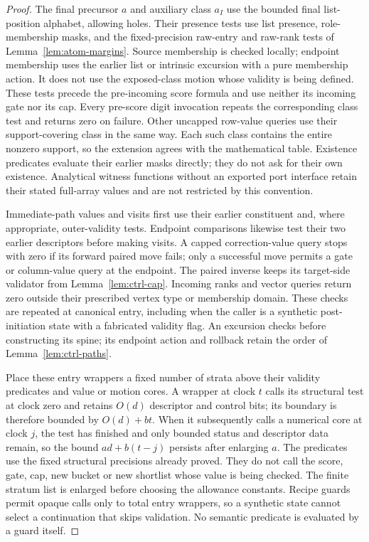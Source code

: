 \documentclass[11pt]{article}
\numberwithin{equation}{section}
\theoremstyle{definition}
\theoremstyle{remark}
\begin{document}
\begin{proof}
The final precursor ${a}$ and auxiliary class ${a}_I$ use the bounded final
list-position alphabet, allowing holes. Their presence tests use list
presence, role-membership masks, and the fixed-precision raw-entry and
raw-rank tests of Lemma~\ref{lem:atom-margins}. Source membership is
checked locally; endpoint membership uses the earlier list or intrinsic
excursion with a pure membership action. It does not use the exposed-class
motion whose validity is being defined. These tests precede the
pre-incoming score formula and use neither its incoming gate nor its
cap. Every pre-score digit invocation repeats the corresponding class
test and returns zero on failure. Other uncapped row-value queries use
their support-covering class in the same way. Each such class contains
the entire nonzero support, so the extension agrees with the mathematical
table. Existence predicates evaluate their earlier masks directly;
they do not ask for their own existence. Analytical witness functions
without an exported port interface retain their stated full-array
values and are not restricted by this convention.

Immediate-path values and visits first use their earlier constituent
and, where appropriate, outer-validity tests. Endpoint comparisons
likewise test their two earlier descriptors before making visits.
A capped correction-value query stops with zero if its forward paired
move fails; only a successful move permits a gate or column-value query
at the endpoint. The paired inverse keeps its target-side validator
from Lemma~\ref{lem:ctrl-cap}. Incoming ranks and vector queries return
zero outside their prescribed vertex type or membership domain. These
checks are repeated at canonical entry, including when the caller is a
synthetic post-initiation state with a fabricated validity flag.
An excursion checks before constructing its spine; its endpoint action
and rollback retain the order of Lemma~\ref{lem:ctrl-paths}.

Place these entry wrappers a fixed number of strata above their
validity predicates and value or motion cores. A wrapper at clock $t$
calls its structural test at clock zero and retains $O(d)$ descriptor
and control bits; its boundary is therefore bounded by $O(d)+bt$.
When it subsequently calls a numerical core at clock $j$, the test has
finished and only bounded status and descriptor data remain, so the
bound $ad+b(t-j)$ persists after enlarging $a$. The predicates use the
fixed structural precisions already proved. They do not call the score,
gate, cap, new bucket or new shortlist whose value is being checked.
The finite stratum list is enlarged before choosing the allowance
constants. Recipe guards permit opaque calls only to total entry
wrappers, so a synthetic state cannot select a continuation that skips
validation. No semantic predicate is evaluated by a guard itself.


\end{proof}
\end{document}
